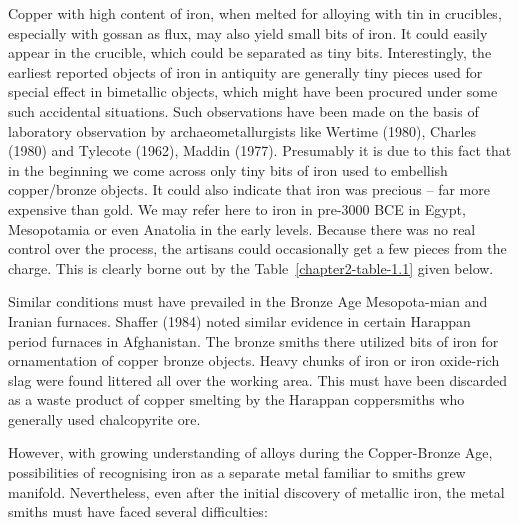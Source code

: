 Copper with high content of iron, when melted for alloying with tin in crucibles, especially with gossan as flux, may also yield small bits of iron. It could easily appear in the crucible, which could be separated as tiny bits.  Interestingly, the earliest reported objects of iron in antiquity are generally tiny pieces used for special effect in bimetallic objects, which might have been procured under some such accidental situations. Such observations have been made on the basis of laboratory observation by archaeometallurgists like Wertime (1980), Charles (1980) and Tylecote (1962), Maddin (1977). Presumably it is due to this fact that in the beginning we come across only tiny bits of iron used to embellish copper/bronze objects. It could also indicate that iron was precious – far more expensive than gold. We may refer here to iron in pre-3000 BCE in Egypt, Mesopotamia or even Anatolia in the early levels. Because there was no real control over the process, the artisans could occasionally get a few pieces from the charge.  This is clearly borne out by the Table~\ref{chapter2-table-1.1} given below. 

Similar conditions must have prevailed in the Bronze Age Mesopota-\break mian and Iranian furnaces. Shaffer (1984) noted similar evidence in certain Harappan period furnaces in Afghanistan. The bronze smiths there utilized bits of iron for ornamentation of copper bronze objects. Heavy chunks of iron or iron oxide-rich slag were found littered all over the working area. This must have been discarded as a waste product of copper smelting by the Harappan coppersmiths who generally used chalcopyrite ore.

However, with growing understanding of alloys during the Copper-Bronze Age, possibilities of recognising iron as a separate metal familiar to smiths grew manifold. Nevertheless, even after the initial discovery of metallic iron, the metal smiths must have faced several difficulties:

\vspace{-.3cm}

